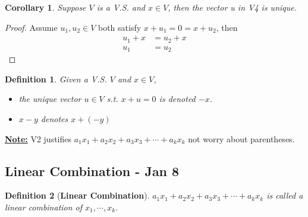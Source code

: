 \documentclass[12pt]{article}
\newtheorem{definition}{Definition}[subsection]
\newtheorem{corollary}{Corollary}[subsection]
\begin{document}
	\begin{corollary}
		Suppose $V$ is a V.S. and $x\in V$, then the vector u in V4 is unique.
	\end{corollary}
	\begin{proof}
		Assume $u_1, u_2\in V$ both satisfy $x+u_1=0=x+u_2$, then 
		\begin{align*}
			u_1+x&=u_2+x \tag{V1}\\
			u_1&=u_2 \tag{By Cancellation}
		\end{align*}
	\end{proof}

	\begin{definition}
		Given a V.S. $V$ and $x\in V$, 
		\begin{itemize}
			\item the unique vector $u\in V$ s.t. $x+u=0$ is denoted $-x$. 
			\item $x-y$ denotes $x + (-y)$
		\end{itemize}
	\end{definition}

	\underline{\textbf{Note:}} V2 justifies 
	$a_1x_1+a_2x_2+a_3x_3+\cdots+a_kx_k$
	not worry about parentheses. \\

	
	

\newpage
\subsection{Linear Combination - Jan 8}
	\begin{definition}[\textbf{Linear Combination}]
			$a_1x_1+a_2x_2+a_3x_3+\cdots+a_kx_k$ is called a linear 
			combination of $x_1,\cdots, x_k$.\\
	\end{definition}
\end{document}
